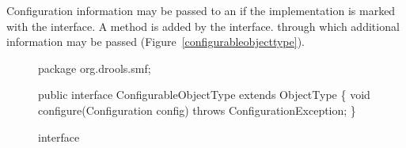 Configuration information may be passed to an 
if the implementation is marked with the
 interface.
A  method
is added by the  interface.
through which additional information may be passed
(Figure~\vref{configurableobjecttype}).

\begin{figure}
\begin{javaCodelisting}
package org.drools.smf;

public interface ConfigurableObjectType
    extends ObjectType
\{
    void configure(Configuration config) throws ConfigurationException;
\}
\end{javaCodelisting}
\caption{ interface}
\label{configurableobjecttype}
\end{figure}



\subsection{}

\subsubsection{}

\subsection{}

\subsubsection{}

\subsection{}

\subsubsection{}

\subsection{}


